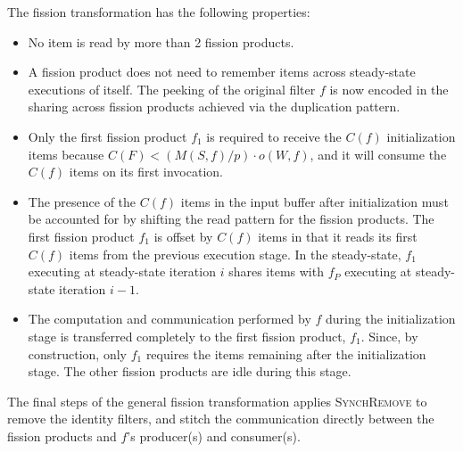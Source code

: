 The fission transformation has the following properties:
\begin{itemize}
\item No item is read by more than 2 fission products.
\item A fission product does not need to remember items across
  steady-state executions of itself. The peeking of the original
  filter $f$ is now encoded in the sharing across fission products
  achieved via the duplication pattern.
\item Only the first fission product $f_1$ is required to receive the $C(f)$
  initialization  items because $C(F) < (M(S,f) / p) \cdot o(W, f)$,
  and it will consume the $C(f)$ items on its first invocation.
\item The presence of the $C(f)$ items in the input buffer after
  initialization must be accounted for by shifting the read pattern
  for the fission products.  The first fission product $f_1$ is offset by
  $C(f)$ items in that it reads its first $C(f)$ items from the
  previous execution stage.  In the steady-state, $f_1$ executing at
  steady-state iteration $i$ shares items with $f_P$ executing at
  steady-state iteration $i-1$.
\item The computation and communication performed by $f$ during the
  initialization stage is transferred completely to the first fission
  product, $f_1$.  Since, by construction, only $f_1$ requires the
  items remaining after the initialization stage.  The other fission
  products are idle during this stage.
\end{itemize}

The final steps of the general fission transformation applies
\textsc{SynchRemove} to remove the identity filters, and stitch the
communication directly between the fission products and $f$'s
producer(s) and consumer(s).
 
